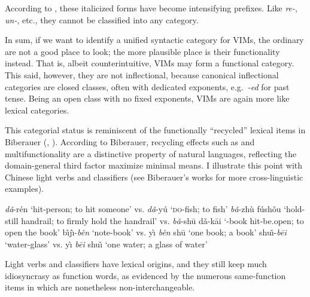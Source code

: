 \documentclass[output=paper]{langsci/langscibook}
\begin{document}
\noindent According to \citet{Kageyama1993}, these italicized forms have become
intensifying prefixes. Like  \textit{re-}, \textit{un-}, etc., they
cannot be classified into any category.


In sum, if we want to identify a unified syntactic category for \glspl{VIM}, the ordinary
 are not a good place to look; the more plausible place
is their functionality instead. That is, albeit counterintuitive, \glspl{VIM}
may form a functional category. This said, however, they are not inflectional,
because canonical inflectional categories are closed classes, often with
dedicated exponents, e.g.\ \textit{-ed} for past tense. Being an open class
with no fixed exponents, \glspl{VIM} are again more
like lexical categories.

This categorial status is reminiscent of the functionally ``recycled'' lexical
items in Biberauer (\citeyear{Biberauer2016b}, \citeyear{Biberauer2017}).
According to Biberauer, recycling effects such as  and
multifunctionality are a distinctive property of natural languages, reflecting
the domain-general third factor maximize minimal means. I illustrate this point
with Chinese light verbs  and classifiers  (see
Biberauer's works for more cross-linguistic examples).

\ea \label{ex:light}
\ea
\textit{d\v{a}}-r\'{e}n {`hit-person; to hit someone' vs.}  \textit{d\v{a}}-y\'{u} {`\textsc{do}-fish; to fish'}
\ex
\textit{b\v{a}}-zh\`{u} f\'{u}sh\v{o}u {`hold-still handrail; to firmly hold
the handrail' vs.} \textit{b\v{a}}-sh\={u} d\v{a}-k\={a}i {`\Disp{}-book hit-be.open; to open the book'}
\z
\ex \label{ex:cl}
    \ea b\v{\i}j\`{\i}-\textit{b\v{e}n} {`note-book' vs.} y\`{\i} \textit{b\v{e}n} sh\={u} {`one \Clf{} book; a book'}
    \ex shu\v{\i}-\textit{b\={e}i} {`water-glass' vs.} y\`{\i} \textit{b\={e}i} shu\v{\i} {`one \Clf{} water; a glass of water'}
    \z
\z

\noindent Light verbs and classifiers have lexical origins, and they still keep
much idiosyncrasy as function words, as evidenced by the numerous same-function
items in  which are nonetheless non-interchangeable.
\end{document}

